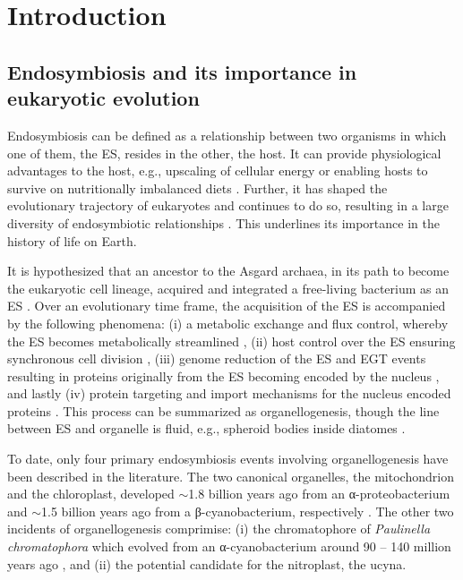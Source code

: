 \chapter{Introduction}
\section{Endosymbiosis and its importance in eukaryotic evolution}
Endosymbiosis can be defined as a relationship between two organisms in which one of them, the \gls{ES}, resides in the other, the host. It can provide physiological advantages to the host, e.g., upscaling of cellular energy or enabling hosts to survive on nutritionally imbalanced diets \parencite{bennett_endosymbioses_2024, sorensen_protein_2025}. Further, it has shaped the evolutionary trajectory of eukaryotes and continues to do so, resulting in a large diversity of endosymbiotic relationships \parencite{douglas_symbiosis_2014, archibald_endosymbiosis_2015, sorensen_protein_2025, bennett_endosymbioses_2024}. This underlines its importance in the history of life on Earth. 
\par It is hypothesized that an ancestor to the Asgard archaea, in its path to become the eukaryotic cell lineage, acquired and integrated a free-living bacterium as an \gls{ES} \parencite{spang_complex_2015, zaremba-niedzwiedzka_asgard_2017}. Over an evolutionary time frame, the acquisition of the \gls{ES} is accompanied by the following phenomena: (i) a metabolic exchange and flux control, whereby the \gls{ES} becomes metabolically streamlined \parencite{bennett_endosymbioses_2024, nowack_genomics-informed_2018}, (ii) host control over the \gls{ES} ensuring synchronous cell division \parencite{sorensen_protein_2025, morales_host-symbiont_2023}, (iii) genome reduction of the \gls{ES} and \gls{EGT} events resulting in proteins originally from the \gls{ES} becoming encoded by the nucleus \parencite{nowack_genomics-informed_2018, timmis_endosymbiotic_2004}, and lastly (iv) protein targeting and import mechanisms for the nucleus encoded proteins \parencite{sorensen_protein_2025, nowack_genomics-informed_2018}. This process can be summarized as organellogenesis, though the line between \gls{ES} and organelle is fluid, e.g., spheroid bodies inside diatomes \parencite{nowack_endosymbiotic_2010, archibald_endosymbiosis_2015}.
\par To date, only four primary endosymbiosis events involving organellogenesis have been described in the literature. The two canonical organelles, the mitochondrion and the chloroplast, developed $\sim$1.8 billion years ago from an \textgreek{α}-proteobacterium and $\sim$1.5 billion years ago from a \textgreek{β}-cyanobacterium, respectively \parencite{parfrey_estimating_2011, gray_mitochondrial_1999, yoon_molecular_2004}. The other two incidents of organellogenesis comprimise: (i) the chromatophore of \emph{Paulinella chromatophora} which evolved from an \textgreek{α}-cyanobacterium around 90 -- 140 million years ago \parencite{nowack_paulinella_2014}, and (ii) the potential candidate for the nitroplast, the \gls{ucyna}.
